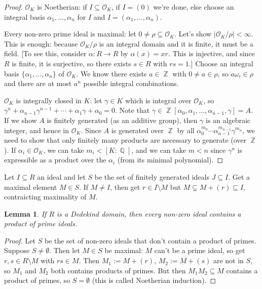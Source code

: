 \documentclass[11pt, a4paper]{memoir}
\DeclareMathOperator{\Q}{{\mathbb{Q}}}
\DeclareMathOperator{\Z}{{\mathbb{Z}}}
\theoremstyle{change}
\newtheorem{lemma}[theorem]{Lemma}
\theoremstyle{plain}
\theoremstyle{nonumberplain}
\newtheorem{proof}{Proof}
\begin{document}
\begin{proof}
    $\mathcal{O}_K$ is Noetherian: if $I\subseteq\mathcal{O}_K$, if $I=(0)$ we're done, else choose an integral basis $\alpha_1,\ldots,\alpha_n$ for $I$ and $I=(\alpha_1,\ldots,\alpha_n)$.

    Every non-zero prime ideal is maximal: let $0\neq \rho\subseteq\mathcal{O}_K$.
    Let's show $|\mathcal{O}_K/\rho|<\infty$.
    This is enough: because $\mathcal{O}_K/\rho$ is an integral domain and it is finite, it must be a field.
    [To see this, consider $\alpha:R\to R$ by $\alpha(x)=xr$.
    This is injective, and since $R$ is finite, it is surjective, so there exists $s\in R$ with $rs=1$.]
    Choose an integral basis $\{\alpha_1,\ldots,\alpha_n\}$ of $\mathcal{O}_K$.
    We know there exists $a\in\Z$ with $0\neq a\in\rho$, so $a\omega_i\in\rho$ and there are at most $a^n$ possible integral combinations.

    $\mathcal{O}_K$ is integrally closed in $K$: let $\gamma\in K$ which is integral over $\mathcal{O}_K$, so $\gamma^n+\alpha_{n-1}\gamma^{n-1}+\cdots+\alpha_1\gamma+\alpha_0=0$.
    Note that $\gamma\in\Z[\alpha_0,\alpha_1,\ldots,\alpha_{n-1},\gamma]=A$.
    If we show $A$ is finitely generated (as an additive group), then $\gamma$ is an algebraic integer, and hence in $\mathcal{O}_K$.
    Since $A$ is generated over $\Z$ by all $\alpha_0^{m_0}\cdots\alpha_{n-1}^{m_{n-1}}\gamma^{m_n}$, we need to show that only finitely many products are necessary to generate (over $\Z$).
    If $\alpha_i\in\mathcal{O}_K$, we can take $m_i<[K:\Q]$, and we can take $m<n$ since $\gamma^n$ is expressible as a product over the $\alpha_i$ (from its minimal polynomial).
\end{proof}
Let $I\subseteq R$ an ideal and let $S$ be the set of finitely generated ideals $J\subseteq I$.
Get a maximal element $M\in S$.
If $M\neq I$, then get $r\in I\setminus M$ but $M\subsetneq M+(r)\subseteq I$, contraicting maximality of $M$.
\begin{lemma}
    If $R$ is a Dedekind domain, then every non-zero ideal contains a product of prime ideals.
\end{lemma}
\begin{proof}
    Let $S$ be the set of non-zero ideals that don't contain a product of primes.
    Suppose $S\neq\emptyset$.
    Then let $M\in S$ be maximal: $M$ can't be a prime ideal, so get $r,s\in R\setminus M$ with $rs\in M$.
    Then $M_1:=M+(r)$, $M_2:=M+(s)$ are not in $S$, so $M_1$ and $M_2$ both contains products of primes.
    But then $M_1M_2\subseteq M$ contains a product of primes, so $S=\emptyset$ (this is called Noetherian induction).
\end{proof}
\end{document}
